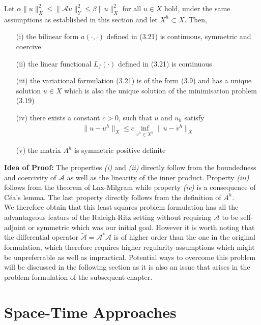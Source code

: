 \documentclass[../draft_1.tex]{subfiles}
\begin{document}
\begin{Theorem}
	Let $\alpha \| u \|_X^2 \leq \| \mathcal{A} u \|_Y^2 \leq \beta \| u \|_X^2$ for all $u \in X$ hold, under the same assumptions as established in this section and let $X^h \subset X$. Then, 
	\begin{itemize}
		\item[(i)] the bilinear form $a(\cdot, \cdot)$ defined in (3.21) is continuous, symmetric and coercive
		\item[(ii)] the linear functional $L_f(\cdot)$ defined in (3.21) is continuous
		\item[(iii)] the variational formulation (3.21) is of the form (3.9) and has a unique solution $u \in X$ which is also the unique solution of the minimisation problem (3.19)
		\item[(iv)] there exists a constant $c > 0$, such that $u$ and $u_h$ satisfy 
		\begin{align}
		\| u - u^h \|_X \leq c \inf_{v^h \in X^h} \| u - v^h\|_X
		\end{align}
	    \item[(v)]	the matrix $A^h$ is symmetric positive definite	
	\end{itemize}
\end{Theorem}

\textbf{Idea of Proof:} The properties \textit{(i)} and \textit{(ii)} directly follow from the boundedness and coercivity of $\mathcal{A}$ as well as the linearity of the inner product. Property \textit{(iii)} follows from the theorem of Lax-Milgram while property \textit{(iv)} is a consequence of C\'{e}a's lemma. The last property directly follows from the definition of $A^h$.
\smallskip
\\
We therefore obtain that this least squares problem formulation has all the advantageous featurs of the Raleigh-Ritz setting without requiring $\mathcal{A}$ to be self-adjoint or symmetric which was our initial goal. However it is worth noting that the differential operator $\tilde{\mathcal{A}} = \mathcal{A}^* \mathcal{A}$ is of higher order than the one in the original formulation, which therefore requires higher regularity assumptions which might be unpreferrable as well as impractical. Potential ways to overcome this problem will be discussed in the following section as it is also an issue that arises in the problem formulation of the subsequent chapter.

\section{Space-Time Approaches}
\end{document}

